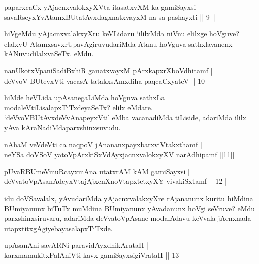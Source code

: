 \begin{shl}
paparxcaCx yAjacnxvalokxyXV\s ta itasatxvXM ka gamiSayxsi|\\
savaRseyxYvA\s \s tamxBUtatAvxdagxnatxvayxM na sa pashayxti \hfill || 9 || 
\end{shl}

\begin{artha}
hiVgeMdu yAjacnxvalakxyXru keVLidaru `ililxMda niVnu elilxge hoVguve? elalxvU AtamxsavxrUpavAgiruvudariMda Atanu hoVguva sathxlavanenx kANuvudilalxvaSeTx. eMdu.
\end{artha}


\begin{shl}
nanUkotxVpaniSadiBxhiR ganatxvayxM pArxkapxrXboVdhitamf |\\
deVvoV BUtevxVti vacasA tatakxsAmxdiha paqcaCxyateV \hfill || 10 || 
\end{shl}

\begin{artha}
hiMde heVLida upAsanegaLiMda hoVguva sathxLa modaleV\break tiLisalapxTiTxdeyaSeTx? elilx eMdare. `deVvoVBUtAvxdeVvAnapeyxVti' eMba vacanadiMda tiLiside, adariMda ililx yAva kAraNadiMda\break parxshinxsuvudu.
\end{artha}


\begin{shl}
nAhaM veVdeVti ca naqpoV jAnananxpayxbarxviVtakxthamf |\\
neYSa doVSoV yatoV\s pArxkiSxVdAyxjacnxvalokxyXV narAdhipamf \hfill ||11|| 
\end{shl}

\begin{shl}
pUvaRBUmeVmuRcayxmAna utatxrAM kAM gamiSayxsi |\\
deVvatoVpAsanAdeyxVtajAjxcnXnoVtapxtetxyXY vivakiSxtamf \hfill || 12 || 
\end{shl}

\begin{artha}
idu doVSavalalx, yAvudariMda yAjacnxvalakxyXre rAjananunx kuritu hiMdina BUmiyanunx biTuTx muMdina BUmiyanunx yAvadanunx hoVgi seVruve? eMdu parxshinxsiruvaru, adariMda deVvatoVpAsane modalAdavu keVvala jAcnxnada utapxtitxgAgiye\break bayasalapxTiTxde.
\end{artha}

\begin{shl}
upAsanAni savARNi paravidAyxdhikArataH |\\
karxmamukitxPalAniVti kavx gamiSayxsigiVrataH \hfill || 13 || 
\end{shl}

